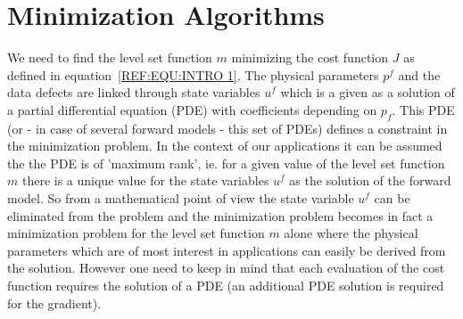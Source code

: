 
%
%
%

\chapter{Minimization Algorithms}\label{chapter:ref:Minimization}
We need to find the level set function $m$ minimizing the cost function $J$ as 
defined in equation~\ref{REF:EQU:INTRO 1}. The physical parameters $p^f$ and the 
data defects are linked through state variables $u^f$ which is a 
given as a solution of a partial differential equation (PDE) with 
coefficients depending on $p_f$. This PDE  (or - in case of several forward models - this set of PDEs)
defines a constraint in the minimization problem. In the context of our applications
it can be assumed the the PDE is of 'maximum rank', ie. for a given value of the level set function $m$
there is a unique value for the state variables $u^f$ as the solution of the forward model. So from a mathematical point of view 
the state variable $u^f$ can be eliminated from the problem and the minimization problem becomes in fact 
a minimization problem for the level set function $m$ alone where the physical parameters which are of most interest
in applications can easily be derived from the solution. However one need to keep in mind that 
each evaluation of the cost function requires the solution of a PDE (an additional PDE solution is required for the 
gradient).

